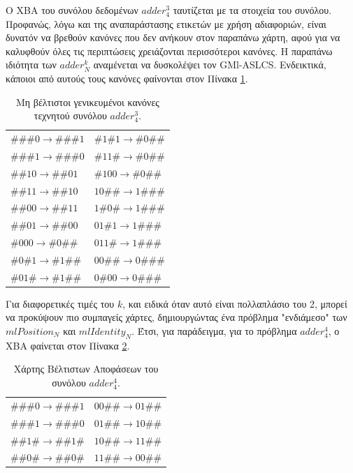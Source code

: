 Ο ΧΒΑ του συνόλου δεδομένων $adder_{4}^{3}$ ταυτίζεται με τα στοιχεία του συνόλου. Προφανώς, λόγω και της αναπαράστασης ετικετών με χρήση αδιαφοριών, είναι δυνατόν να βρεθούν κανόνες που δεν ανήκουν στον παραπάνω χάρτη, αφού για να καλυφθούν όλες τις περιπτώσεις χρειάζονται περισσότεροι κανόνες. Η παραπάνω ιδιότητα των $adder^{k}_{N}$ αναμένεται να δυσκολέψει τον GMl-ASLCS. Ενδεικτικά, κάποιοι από αυτούς τους κανόνες φαίνονται στον Πίνακα \ref{table:adder4rules}. 

\begin{table}[!h]
\caption{Μη βέλτιστοι γενικευμένοι κανόνες τεχνητού συνόλου $adder_4^3$.}
\begin{center}
\begin{tabular}{l|l}
$\#\#\#0 \rightarrow \#\#\#1$ & $\#1\#1 \rightarrow \#0\#\#$	\\
$\#\#\#1 \rightarrow \#\#\#0$ & $\#11\# \rightarrow \#0\#\#$	\\
$\#\#10 \rightarrow  \#\#01$  & $\#100 	 \rightarrow \#0\#\#$	\\
$\#\#11 \rightarrow  \#\#10$  & $10\#\#  \rightarrow 1\#\#\#$	\\
$\#\#00 \rightarrow  \#\#11$  & $1\#0\#  \rightarrow 1\#\#\#$	\\
$\#\#01 \rightarrow  \#\#00$  & $01\#1   \rightarrow 1\#\#\#$	\\
$\#000 \rightarrow   \#0\#\#$ & $011\#  \rightarrow 1\#\#\#$	\\
$\#0\#1 \rightarrow  \#1\#\#$ & $00\#\# \rightarrow 0\#\#\#$	\\
$\#01\# \rightarrow  \#1\#\#$ & $0\#00  \rightarrow 0\#\#\#$	\\
\end{tabular}
\end{center}
\label{table:adder4rules}
\end{table}


Για διαφορετικές τιμές του $k$, και ειδικά όταν αυτό είναι πολλαπλάσιο του 2, μπορεί να προκύψουν πιο συμπαγείς χάρτες, δημιουργώντας ένα πρόβλημα "ενδιάμεσο" των $mlPosition_{N}$ και $mlIdentity_{N}$. Έτσι, για παράδειγμα, για το πρόβλημα $adder_{4}^{4}$, ο ΧΒΑ φαίνεται στον Πίνακα \ref{table:adder44rules}.

\begin{table}[htbp]
\caption{Χάρτης Βέλτιστων Αποφάσεων του συνόλου $adder_4^4$.}
\begin{center}
\begin{tabular}{l|l}
$\#\#\#0 \rightarrow \#\#\#1$ & $00\#\# \rightarrow 01\#\#$	\\
$\#\#\#1 \rightarrow \#\#\#0$ & $01\#\# \rightarrow 10\#\#$	\\
$\#\#1\# \rightarrow \#\#1\#$ & $10\#\# \rightarrow 11\#\#$	\\
$\#\#0\# \rightarrow \#\#0\#$ & $11\#\# \rightarrow 00\#\#$	\\
\end{tabular}
\end{center}
\label{table:adder44rules}
\end{table}

